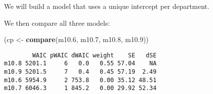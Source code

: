 \documentclass[]{tufte-handout}
\newenvironment{Shaded}{}{}
\newcommand{\KeywordTok}[1]{\textcolor[rgb]{0.00,0.44,0.13}{\textbf{#1}}}
\newcommand{\DataTypeTok}[1]{\textcolor[rgb]{0.56,0.13,0.00}{#1}}
\newcommand{\DecValTok}[1]{\textcolor[rgb]{0.25,0.63,0.44}{#1}}
\newcommand{\FloatTok}[1]{\textcolor[rgb]{0.25,0.63,0.44}{#1}}
\newcommand{\StringTok}[1]{\textcolor[rgb]{0.25,0.44,0.63}{#1}}
\newcommand{\CommentTok}[1]{\textcolor[rgb]{0.38,0.63,0.69}{\textit{#1}}}
\newcommand{\OperatorTok}[1]{\textcolor[rgb]{0.40,0.40,0.40}{#1}}
\newcommand{\NormalTok}[1]{#1}
\begin{document}
We will build a model that uses a unique intercept per department.

\begin{Shaded}
\end{Shaded}

We then compare all three models:

\begin{Shaded}
\begin{Highlighting}[]
\NormalTok{(cp <-}\StringTok{ }\KeywordTok{compare}\NormalTok{(m10}\FloatTok{.6}\NormalTok{, m10}\FloatTok{.7}\NormalTok{, m10}\FloatTok{.8}\NormalTok{, m10}\FloatTok{.9}\NormalTok{))}
\end{Highlighting}
\end{Shaded}

\begin{verbatim}
        WAIC pWAIC dWAIC weight    SE   dSE
m10.8 5201.1     6   0.0   0.55 57.04    NA
m10.9 5201.5     7   0.4   0.45 57.19  2.49
m10.6 5954.9     2 753.8   0.00 35.12 48.51
m10.7 6046.3     1 845.2   0.00 29.92 52.34
\end{verbatim}
\end{document}
